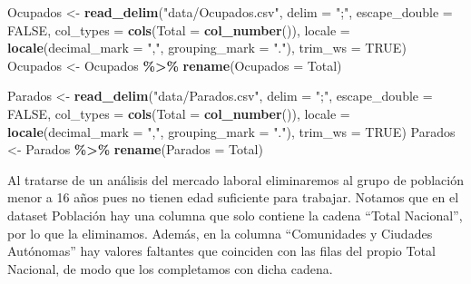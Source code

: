 \documentclass[notspecified,article,submit,moreauthors,pdftex]{Definitions/mdpi}
\newenvironment{Shaded}{\begin{snugshade}}{\end{snugshade}}
\newcommand{\AttributeTok}[1]{\textcolor[rgb]{0.13,0.29,0.53}{#1}}
\newcommand{\ConstantTok}[1]{\textcolor[rgb]{0.56,0.35,0.01}{#1}}
\newcommand{\FunctionTok}[1]{\textcolor[rgb]{0.13,0.29,0.53}{\textbf{#1}}}
\newcommand{\NormalTok}[1]{#1}
\newcommand{\OtherTok}[1]{\textcolor[rgb]{0.56,0.35,0.01}{#1}}
\newcommand{\SpecialCharTok}[1]{\textcolor[rgb]{0.81,0.36,0.00}{\textbf{#1}}}
\newcommand{\StringTok}[1]{\textcolor[rgb]{0.31,0.60,0.02}{#1}}
\begin{document}
\begin{Shaded}
\begin{Highlighting}[]
\NormalTok{Ocupados }\OtherTok{\textless{}{-}} \FunctionTok{read\_delim}\NormalTok{(}\StringTok{"data/Ocupados.csv"}\NormalTok{, }
    \AttributeTok{delim =} \StringTok{";"}\NormalTok{, }\AttributeTok{escape\_double =} \ConstantTok{FALSE}\NormalTok{, }\AttributeTok{col\_types =} \FunctionTok{cols}\NormalTok{(}\AttributeTok{Total =} \FunctionTok{col\_number}\NormalTok{()), }
    \AttributeTok{locale =} \FunctionTok{locale}\NormalTok{(}\AttributeTok{decimal\_mark =} \StringTok{","}\NormalTok{, }\AttributeTok{grouping\_mark =} \StringTok{"."}\NormalTok{), }
    \AttributeTok{trim\_ws =} \ConstantTok{TRUE}\NormalTok{)}
\NormalTok{Ocupados }\OtherTok{\textless{}{-}}\NormalTok{ Ocupados }\SpecialCharTok{\%\textgreater{}\%} \FunctionTok{rename}\NormalTok{(}\StringTok{\textasciigrave{}}\AttributeTok{Ocupados}\StringTok{\textasciigrave{}} \OtherTok{=} \StringTok{\textasciigrave{}}\AttributeTok{Total}\StringTok{\textasciigrave{}}\NormalTok{)}

\NormalTok{Parados }\OtherTok{\textless{}{-}} \FunctionTok{read\_delim}\NormalTok{(}\StringTok{"data/Parados.csv"}\NormalTok{, }
    \AttributeTok{delim =} \StringTok{";"}\NormalTok{, }\AttributeTok{escape\_double =} \ConstantTok{FALSE}\NormalTok{, }\AttributeTok{col\_types =} \FunctionTok{cols}\NormalTok{(}\AttributeTok{Total =} \FunctionTok{col\_number}\NormalTok{()), }
    \AttributeTok{locale =} \FunctionTok{locale}\NormalTok{(}\AttributeTok{decimal\_mark =} \StringTok{","}\NormalTok{, }\AttributeTok{grouping\_mark =} \StringTok{"."}\NormalTok{), }
    \AttributeTok{trim\_ws =} \ConstantTok{TRUE}\NormalTok{)}
\NormalTok{Parados }\OtherTok{\textless{}{-}}\NormalTok{ Parados }\SpecialCharTok{\%\textgreater{}\%} \FunctionTok{rename}\NormalTok{(}\StringTok{\textasciigrave{}}\AttributeTok{Parados}\StringTok{\textasciigrave{}} \OtherTok{=} \StringTok{\textasciigrave{}}\AttributeTok{Total}\StringTok{\textasciigrave{}}\NormalTok{)}
\end{Highlighting}
\end{Shaded}

Al tratarse de un análisis del mercado laboral eliminaremos al grupo de
población menor a 16 años pues no tienen edad suficiente para trabajar.
Notamos que en el dataset Población hay una columna que solo contiene la
cadena ``Total Nacional'', por lo que la eliminamos. Además, en la
columna ``Comunidades y Ciudades Autónomas'' hay valores faltantes que
coinciden con las filas del propio Total Nacional, de modo que los
completamos con dicha cadena.
\end{document}
